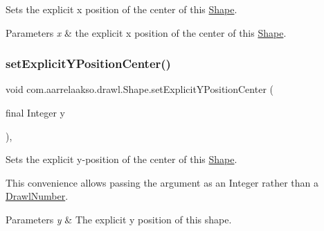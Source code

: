 Sets the explicit x position of the center of this \hyperlink{classcom_1_1aarrelaakso_1_1drawl_1_1_shape}{Shape}. 


\begin{DoxyParams}{Parameters}
{\em x} & the explicit x position of the center of this \hyperlink{classcom_1_1aarrelaakso_1_1drawl_1_1_shape}{Shape}. \\
\hline
\end{DoxyParams}
\mbox{\label{classcom_1_1aarrelaakso_1_1drawl_1_1_shape_a93e9e1bdd05f111661660e9de621cd12}} 
\subsubsection{\texorpdfstring{set\+Explicit\+Y\+Position\+Center()}{setExplicitYPositionCenter()}\hspace{0.1cm}{\footnotesize\ttfamily [1/2]}}
{\footnotesize\ttfamily void com.\+aarrelaakso.\+drawl.\+Shape.\+set\+Explicit\+Y\+Position\+Center (\begin{DoxyParamCaption}\item[{final Integer}]{y }\end{DoxyParamCaption})\hspace{0.3cm}{\ttfamily [protected]}, {\ttfamily [inherited]}}



Sets the explicit y-\/position of the center of this \hyperlink{classcom_1_1aarrelaakso_1_1drawl_1_1_shape}{Shape}. 

This convenience allows passing the argument as an Integer rather than a \hyperlink{classcom_1_1aarrelaakso_1_1drawl_1_1_drawl_number}{Drawl\+Number}.


\begin{DoxyParams}{Parameters}
{\em y} & The explicit y position of this shape. \\
\hline
\end{DoxyParams}
\mbox{\label{classcom_1_1aarrelaakso_1_1drawl_1_1_shape_a7d49d69bd74e57c3a3341a025c3cce50}} 

